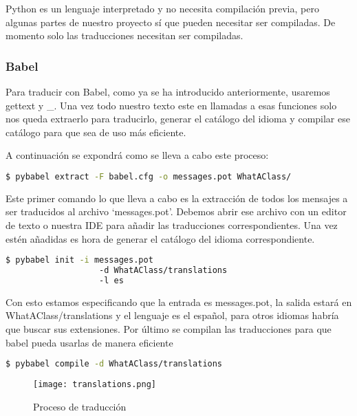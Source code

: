 Python es un lenguaje interpretado y no necesita compilación previa, pero algunas partes de nuestro proyecto sí que pueden necesitar ser compiladas. De momento solo las traducciones necesitan ser compiladas.

\subsubsection{Babel}

Para traducir con Babel, como ya se ha introducido anteriormente, usaremos gettext y \_. Una vez todo nuestro texto este en llamadas a esas funciones solo nos queda extraerlo para traducirlo, generar el catálogo del idioma y compilar ese catálogo para que sea de uso más eficiente.

A continuación se expondrá como se lleva a cabo este proceso:

\lstset{style=linestyle}
\begin{lstlisting}[language=bash]
    $ pybabel extract -F babel.cfg -o messages.pot WhatAClass/
\end{lstlisting}

Este primer comando lo que lleva a cabo es la extracción de todos los mensajes a ser traducidos al archivo `messages.pot'. Debemos abrir ese archivo con un editor de texto o nuestra IDE para añadir las traducciones correspondientes. Una vez estén añadidas es hora de generar el catálogo del idioma correspondiente. 

\begin{lstlisting}[language=bash]
    $ pybabel init -i messages.pot 
                   -d WhatAClass/translations 
                   -l es
\end{lstlisting}

Con esto estamos especificando que la entrada es messages.pot, la salida estará en WhatAClass/translations y el lenguaje es el español, para otros idiomas habría que buscar sus extensiones. Por último se compilan las traducciones para que babel pueda usarlas de manera eficiente

\begin{lstlisting}[language=bash]
    $ pybabel compile -d WhatAClass/translations
\end{lstlisting}

\begin{figure}
	\centering
	\texttt{[image: translations.png]}
	\caption{Proceso de traducción}\label{fig:translations.png}
\end{figure}





